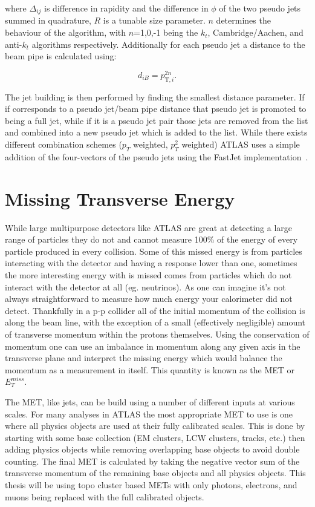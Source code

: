 where $\Delta_{ij}$ is difference in rapidity and the difference in $\phi$ of the two pseudo jets summed in quadrature, $R$ is a tunable size parameter.  
$n$ determines the behaviour of the algorithm, with $n$=1,0,-1 being the $k_t$, Cambridge/Aachen, and anti-$k_t$ algorithms respectively.  
Additionally for each pseudo jet a distance to the beam pipe is calculated using:

\begin{equation}
  d_{iB} = p_{\mathrm T,i}^{2n}.
\end{equation}  

The jet building is then performed by finding the smallest distance parameter.  
If if corresponds to a pseudo jet/beam pipe distance that pseudo jet is promoted to being a full jet, while if it is a pseudo jet pair those jets are removed from the list and combined into a new pseudo jet which is added to the list.  
While there exists different combination schemes ($p_T$ weighted, $p_T^2$ weighted) ATLAS uses a simple addition of the four-vectors of the pseudo jets using the FastJet implementation~\cite{Cacciari:2011ma}.

\section{Missing Transverse Energy}

While large multipurpose detectors like ATLAS are great at detecting a large range of particles they do not and cannot measure 100\% of the energy of every particle produced in every collision.  
Some of this missed energy is from particles interacting with the detector and having a response lower than one, sometimes the more interesting energy with is missed comes from particles which do not interact with the detector at all (eg. neutrinos).  
As one can imagine it's not always straightforward to measure how much energy your calorimeter did not detect.  
Thankfully in a p-p collider all of the initial momentum of the collision is along the beam line, with the exception of a small (effectively negligible) amount of transverse momentum within the protons themselves.  
Using the conservation of momentum one can use an imbalance in momentum along any given axis in the transverse plane and interpret the missing energy which would balance the momentum as a measurement in itself.  
This quantity is known as the \gls{MET} or $E_T^{miss}$.  


The MET, like jets, can be build using a number of different inputs at various scales.  
For many analyses in ATLAS the most appropriate MET to use is one where all physics objects are used at their fully calibrated scales.  
This is done by starting with some base collection (EM clusters, LCW clusters, tracks, etc.) then adding physics objects while removing overlapping base objects to avoid double counting.  
The final MET is calculated by taking the negative vector sum of the transverse momentum of the remaining base objects and all physics objects.  
This thesis will be using topo cluster based METs with only photons, electrons, and muons being replaced with the full calibrated objects.  




